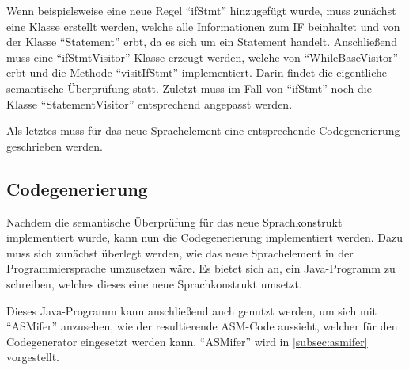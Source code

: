Wenn beispielsweise eine neue Regel \enquote{ifStmt} hinzugefügt wurde, muss zunächst eine Klasse erstellt werden, welche alle Informationen zum IF beinhaltet und von der Klasse \enquote{Statement} erbt, da es sich um ein Statement handelt. Anschließend muss eine \enquote{ifStmtVisitor}-Klasse erzeugt werden, welche von \enquote{WhileBaseVisitor} erbt und die Methode \enquote{visitIfStmt} implementiert. Darin findet die eigentliche semantische Überprüfung statt. Zuletzt muss im Fall von \enquote{ifStmt} noch die Klasse \enquote{StatementVisitor} entsprechend angepasst werden.

Als letztes muss für das neue Sprachelement eine entsprechende Codegenerierung geschrieben werden.

\subsection{Codegenerierung}
Nachdem die semantische Überprüfung für das neue Sprachkonstrukt implementiert wurde, kann nun die Codegenerierung implementiert werden. Dazu muss sich zunächst überlegt werden, wie das neue Sprachelement in der Programmiersprache umzusetzen wäre. Es bietet sich an, ein Java-Programm zu schreiben, welches dieses eine neue Sprachkonstrukt umsetzt.

Dieses Java-Programm kann anschließend auch genutzt werden, um sich mit \enquote{ASMifer} anzusehen, wie der resultierende ASM-Code aussieht, welcher für den Codegenerator eingesetzt werden kann. \enquote{ASMifer} wird in \cref{subsec:asmifer} vorgestellt.
